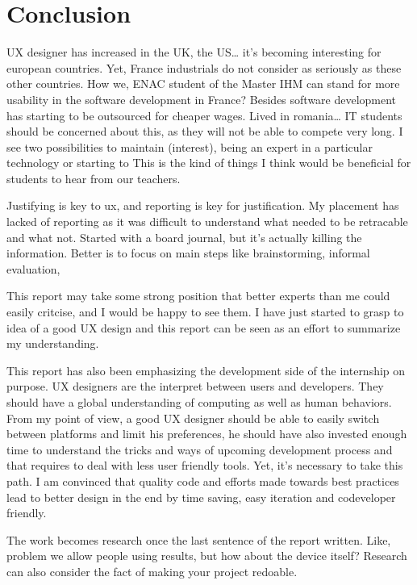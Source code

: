 \chapter{Conclusion}

UX designer has increased in the UK, the US\ldots{} it's becoming
interesting for european countries. Yet, France industrials do not
consider as seriously as these other countries. How we, ENAC student of
the Master IHM can stand for more usability in the software development
in France? Besides software development has starting to be outsourced
for cheaper wages. Lived in romania\ldots{} IT students should be
concerned about this, as they will not be able to compete very long. I
see two possibilities to maintain (interest), being an expert in a
particular technology or starting to This is the kind of things I think
would be beneficial for students to hear from our teachers.

Justifying is key to ux, and reporting is key for justification. My
placement has lacked of reporting as it was difficult to understand what
needed to be retracable and what not. Started with a board journal, but
it's actually killing the information. Better is to focus on main steps
like brainstorming, informal evaluation,

This report may take some strong position that better experts than me
could easily critcise, and I would be happy to see them. I have just
started to grasp to idea of a good UX design and this report can be seen
as an effort to summarize my understanding.

This report has also been emphasizing the development side of the
internship on purpose. UX designers are the interpret between users and
developers. They should have a global understanding of computing as well
as human behaviors. From my point of view, a good UX designer should be
able to easily switch between platforms and limit his preferences, he
should have also invested enough time to understand the tricks and ways
of upcoming development process and that requires to deal with less user
friendly tools. Yet, it's necessary to take this path. I am convinced
that quality code and efforts made towards best practices lead to better
design in the end by time saving, easy iteration and codeveloper
friendly.

The work becomes research once the last sentence of the report written.
Like, problem we allow people using results, but how about the device
itself? Research can also consider the fact of making your project
redoable.
